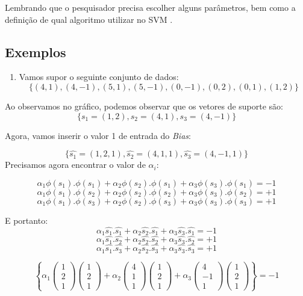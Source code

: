 \documentclass[
  openany]{book}
\providecommand{\tightlist}{%
  \setlength{\itemsep}{0pt}\setlength{\parskip}{0pt}}
\begin{document}
Lembrando que o pesquisador precisa escolher alguns parâmetros, bem como a definição de qual algoritmo utilizar no SVM \citep{lorena2003introduccaoas}.

\hypertarget{exemplosvm}{%
\subsection{Exemplos}\label{exemplosvm}}

\begin{enumerate}
\def\labelenumi{\arabic{enumi}.}
\tightlist
\item
  Vamos supor o seguinte conjunto de dados:
  \[\{ (4,1), (4,-1), (5,1), (5,-1), (0,-1), (0,2), (0,1), (1,2) \}\]
\end{enumerate}

Ao observamos no gráfico, podemos observar que os vetores de suporte são:
\[\{s_1=(1,2),s_2=(4,1),s_3=(4,-1)\}\]

Agora, vamos inserir o valor 1 de entrada do \emph{Bias}:

\[\{\hat{s_1}=(1,2,1),\hat{s_2}=(4,1,1),\hat{s_3}=(4,-1,1)\}\]
Precisamos agora encontrar o valor de \(\alpha_i\):

\[\alpha_1 \phi(s_1).\phi(s_1)+\alpha_2 \phi(s_2).\phi(s_1)+\alpha_3 \phi (s_3).\phi (s_1)=-1\]
\[\alpha_1 \phi(s_1).\phi(s_2)+\alpha_2 \phi(s_2).\phi(s_2)+\alpha_3 \phi (s_3).\phi (s_2)=+1\]
\[\alpha_1 \phi(s_1).\phi(s_3)+\alpha_2 \phi(s_2).\phi(s_3)+\alpha_3 \phi (s_3).\phi (s_3)=+1\]

E portanto:
\[\alpha_1 \hat{s_1}.\hat{s_1}+\alpha_2 \hat{s_2}.\hat{s_1}+\alpha_3 \hat{s_3}.\hat{s_1}=-1\]
\[\alpha_1 \hat{s_1}.\hat{s_2}+\alpha_2 \hat{s_2}.\hat{s_2}+\alpha_3 \hat{s_3}.\hat{s_2}=+1\]
\[\alpha_1 \hat{s_1}.\hat{s_3}+\alpha_2 \hat{s_2}.\hat{s_3}+\alpha_3 \hat{s_3}.\hat{s_3}=+1\]

\[\left\{
\alpha_1
\begin{pmatrix}
1\\2\\1
\end{pmatrix}
\begin{pmatrix}
1\\2\\1
\end{pmatrix} +
\alpha_2
\begin{pmatrix}
4\\1\\1
\end{pmatrix}
\begin{pmatrix}
1\\2\\1
\end{pmatrix}+
\alpha_3
\begin{pmatrix}
4\\-1\\1
\end{pmatrix}
\begin{pmatrix}
1\\2\\1
\end{pmatrix}
\right\}=-1\]
\end{document}
